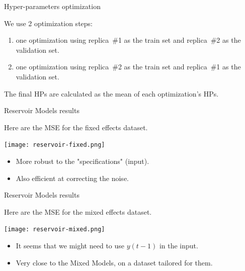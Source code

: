 \documentclass{beamer}
\begin{document}
\begin{frame}{Hyper-parameters optimization}

We use 2 optimization steps:
\begin{enumerate}
\item one optimization using replica~\#1 as the train set and replica~\#2 as the validation set. \\ 
\item one optimization using replica~\#2 as the train set and replica~\#1 as the validation set. 
\end{enumerate}

\medskip

The final HPs are calculated as the mean of each optimization's HPs. \\

\end{frame}



\begin{frame}{Reservoir Models results}

Here are the MSE for the fixed effects dataset.
\medskip

\centering
\texttt{[image: reservoir-fixed.png]}
\

\medskip

\begin{itemize}
	\item More robust to the "specifications" (input).\\
	\item Also efficient at correcting the noise.
\end{itemize}


\end{frame}



\begin{frame}{Reservoir Models results}

Here are the MSE for the mixed effects dataset.
\medskip

\centering
\texttt{[image: reservoir-mixed.png]}
\

\medskip

\begin{itemize}
	\item It seems that we might need to use $y(t-1)$ in the input.\\
	\item Very close to the Mixed Models, on a dataset tailored for them.
\end{itemize}


\end{frame}
\end{document}
